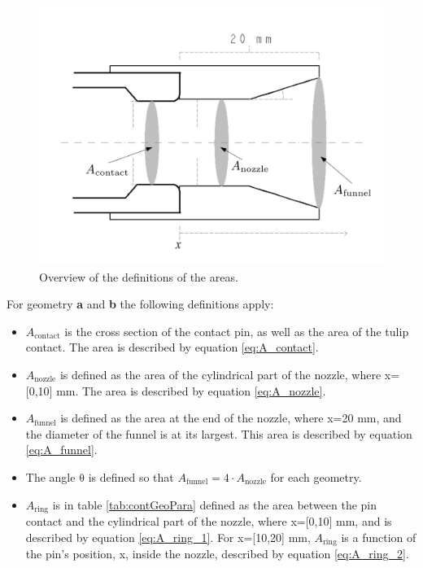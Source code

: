\documentclass[10pt,b5paper,twoside]{article}
\begin{document}
\begin{figure} [H] %
\centering
\includegraphics[scale=0.30]{Bilder/Method/AreaDef.png}
\caption{Overview of the definitions of the areas.} \label{fig:AreacontactAndNozzle}
\end{figure}

For geometry \textbf{a} and \textbf{b} the following definitions apply:
\begin{itemize}
\item $A_\mathrm{{contact}}$ is the cross section of the contact pin, as well as the area of the tulip contact. The area is described by equation \eqref{eq:A_contact}.

\item $A_\mathrm{{nozzle}}$ is defined as the area of the cylindrical part of the nozzle, where x=[0,10] mm. The area is described by equation \eqref{eq:A_nozzle}.

\item $A_\mathrm{{funnel}}$ is defined as the area at the end of the nozzle, where x=20 mm, and the diameter of the funnel is at its largest. This area is described by equation \eqref{eq:A_funnel}.

\item The angle $\mathrm{\theta}$ is defined so that $A_\mathrm{{funnel}}=4 \cdot A_\mathrm{{nozzle}}$ for each geometry.

\item $A_\mathrm{{ring}}$ is in table \ref{tab:contGeoPara} defined as the area between the pin contact and the cylindrical part of the nozzle, where x=[0,10] mm, and is described by equation \eqref{eq:A_ring_1}. For x=[10,20] mm, $A_\mathrm{{ring}}$ is a function of the pin's position, x, inside the nozzle, described by equation \eqref{eq:A_ring_2}.
\end{itemize}
\end{document}
